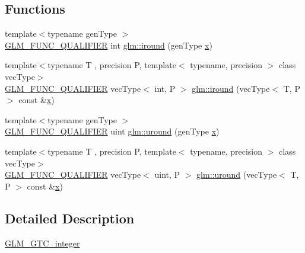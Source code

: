 \subsection*{Functions}
\begin{DoxyCompactItemize}
\item 
{\footnotesize template$<$typename gen\+Type $>$ }\\\mbox{\hyperlink{setup_8hpp_a33fdea6f91c5f834105f7415e2a64407}{G\+L\+M\+\_\+\+F\+U\+N\+C\+\_\+\+Q\+U\+A\+L\+I\+F\+I\+ER}} int \mbox{\hyperlink{namespaceglm_ac64c94481641999914b9eab162db3a0f}{glm\+::iround}} (gen\+Type \mbox{\hyperlink{glad_8h_a92d0386e5c19fb81ea88c9f99644ab1d}{x}})
\item 
{\footnotesize template$<$typename T , precision P, template$<$ typename, precision $>$ class vec\+Type$>$ }\\\mbox{\hyperlink{setup_8hpp_a33fdea6f91c5f834105f7415e2a64407}{G\+L\+M\+\_\+\+F\+U\+N\+C\+\_\+\+Q\+U\+A\+L\+I\+F\+I\+ER}} vec\+Type$<$ int, P $>$ \mbox{\hyperlink{group__gtc__integer_ga0a42ffb863cc980e91f98d2f5766de20}{glm\+::iround}} (vec\+Type$<$ T, P $>$ const \&\mbox{\hyperlink{glad_8h_a92d0386e5c19fb81ea88c9f99644ab1d}{x}})
\item 
{\footnotesize template$<$typename gen\+Type $>$ }\\\mbox{\hyperlink{setup_8hpp_a33fdea6f91c5f834105f7415e2a64407}{G\+L\+M\+\_\+\+F\+U\+N\+C\+\_\+\+Q\+U\+A\+L\+I\+F\+I\+ER}} uint \mbox{\hyperlink{namespaceglm_a2929f3403ed935b4537cb5e5b51219ee}{glm\+::uround}} (gen\+Type \mbox{\hyperlink{glad_8h_a92d0386e5c19fb81ea88c9f99644ab1d}{x}})
\item 
{\footnotesize template$<$typename T , precision P, template$<$ typename, precision $>$ class vec\+Type$>$ }\\\mbox{\hyperlink{setup_8hpp_a33fdea6f91c5f834105f7415e2a64407}{G\+L\+M\+\_\+\+F\+U\+N\+C\+\_\+\+Q\+U\+A\+L\+I\+F\+I\+ER}} vec\+Type$<$ uint, P $>$ \mbox{\hyperlink{group__gtc__integer_gab61b8546aafdf58f119eb892b212607c}{glm\+::uround}} (vec\+Type$<$ T, P $>$ const \&\mbox{\hyperlink{glad_8h_a92d0386e5c19fb81ea88c9f99644ab1d}{x}})
\end{DoxyCompactItemize}


\subsection{Detailed Description}
\mbox{\hyperlink{group__gtc__integer}{G\+L\+M\+\_\+\+G\+T\+C\+\_\+integer}} 